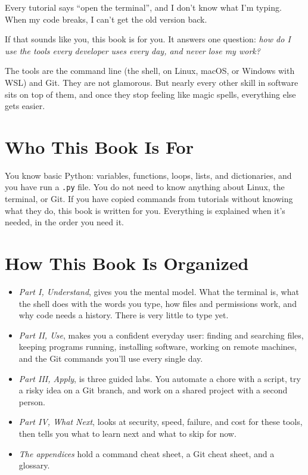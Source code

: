 
\begin{chapterintro}

Every tutorial says ``open the terminal'', and I don't know what I'm typing. When my code breaks, I can't get the old version back.

\end{chapterintro}

If that sounds like you, this book is for you. It answers one question: \emph{how do I use the tools every developer uses every day, and never lose my work?}

The tools are the command line (the shell, on Linux, macOS, or Windows with WSL) and Git. They are not glamorous. But nearly every other skill in software sits on top of them, and once they stop feeling like magic spells, everything else gets easier.

\section{Who This Book Is For}\label{00-preface:who-this-book-is-for}

You know basic Python: variables, functions, loops, lists, and dictionaries, and you have run a \texttt{.py} file. You do not need to know anything about Linux, the terminal, or Git. If you have copied commands from tutorials without knowing what they do, this book is written for you. Everything is explained when it's needed, in the order you need it.

\section{How This Book Is Organized}\label{00-preface:how-this-book-is-organized}

\begin{itemize}
\tightlist
\item
  \emph{Part I, Understand}, gives you the mental model. What the terminal is, what the shell does with the words you type, how files and permissions work, and why code needs a history. There is very little to type yet.
\item
  \emph{Part II, Use}, makes you a confident everyday user: finding and searching files, keeping programs running, installing software, working on remote machines, and the Git commands you'll use every single day.
\item
  \emph{Part III, Apply}, is three guided labs. You automate a chore with a script, try a risky idea on a Git branch, and work on a shared project with a second person.
\item
  \emph{Part IV, What Next}, looks at security, speed, failure, and cost for these tools, then tells you what to learn next and what to skip for now.
\item
  \emph{The appendices} hold a command cheat sheet, a Git cheat sheet, and a glossary.
\end{itemize}

